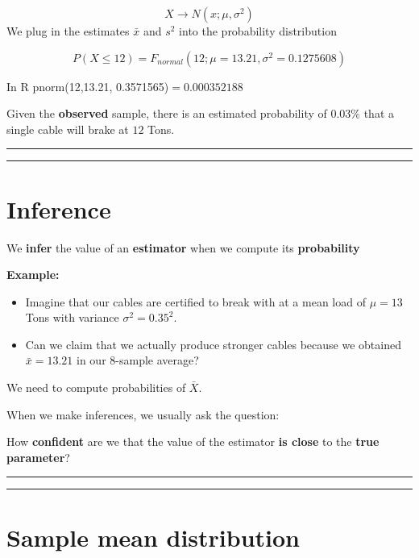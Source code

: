 \documentclass[
]{book}
\providecommand{\tightlist}{%
  \setlength{\itemsep}{0pt}\setlength{\parskip}{0pt}}
\begin{document}
\[X \rightarrow N(x; \mu, \sigma^2)\]
We plug in the estimates \(\bar{x}\) and \(s^2\) into the probability distribution

\[P(X \leq 12)= F_{normal}(12; \mu=13.21, \sigma^2=0.1275608)\]

In R pnorm(12,13.21, 0.3571565)\(=0.000352188\)

Given the \textbf{observed} sample, there is an estimated probability of \(0.03\%\) that a single cable will brake at \(12\) Tons.

\begin{center}\rule{0.5\linewidth}{0.5pt}\end{center}

\begin{center}\rule{0.5\linewidth}{0.5pt}\end{center}

\hypertarget{inference}{%
\section{Inference}\label{inference}}

We \textbf{infer} the value of an \textbf{estimator} when we compute its \textbf{probability}

\textbf{Example:}

\begin{itemize}
\tightlist
\item
  Imagine that our cables are certified to break with at a mean load of \(\mu = 13\) Tons with variance \(\sigma^2=0.35^2\).
\item
  Can we claim that we actually produce stronger cables because we obtained \(\bar{x}=13.21\) in our \(8\)-sample average?
\end{itemize}

We need to compute probabilities of \(\bar{X}\).

When we make inferences, we usually ask the question:

How \textbf{confident} are we that the value of the estimator \textbf{is close} to the \textbf{true parameter}?

\begin{center}\rule{0.5\linewidth}{0.5pt}\end{center}

\begin{center}\rule{0.5\linewidth}{0.5pt}\end{center}

\hypertarget{sample-mean-distribution}{%
\section{Sample mean distribution}\label{sample-mean-distribution}}
\end{document}
